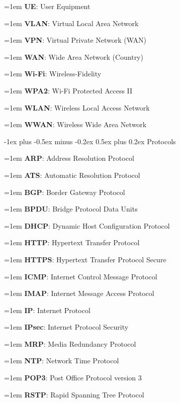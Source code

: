 \documentclass[letterpaper,8pt]{extarticle}
\makeatletter
\newcommand{\definition}[2]{
  \hangindent=1em
  \textbf{#1}: #2%
}
\renewcommand{\subsection}{\@startsection{subsection}{2}{0mm}%
  {-1ex plus -0.5ex minus -0.2ex}%
  {0.5ex plus 0.2ex}%
{\color{h2}\normalfont\fontsize{6}{6}\selectfont\bfseries}}
\makeatother
\begin{document}
\begin{multicols*}{5}
\begin{multicols*}{2}
    \definition{UE}{User Equipment}
    
    \definition{VLAN}{Virtual Local Area Network}
    
    \definition{VPN}{Virtual Private Network (WAN)}
    
    \definition{WAN}{Wide Area Network (Country)}
    
    \definition{Wi-Fi}{Wireless-Fidelity}
    
    \definition{WPA2}{Wi-Fi Protected Access II}
    
    \definition{WLAN}{Wireless Local Access Network}
    
    \definition{WWAN}{Wireless Wide Area Network}
    
  \end{multicols*}
  
  \subsection{Protocols}
  
  \begin{multicols*}{2}
    
    \definition{ARP}{Address Resolution Protocol}
    
    \definition{ATS}{Automatic Resolution Protocol}
    
    \definition{BGP}{Border Gateway Protocol}
    
    \definition{BPDU}{Bridge Protocol Data Units}
    
    \definition{DHCP}{Dynamic Host Configuration Protocol}
    
    \definition{HTTP}{Hypertext Transfer Protocol}
    
    \definition{HTTPS}{Hypertext Transfer Protocol Secure}
    
    \definition{ICMP}{Internet Control Message Protocol}
    
    \definition{IMAP}{Internet Message Access Protocol}
    
    \definition{IP}{Internet Protocol}
    
    \definition{IPsec}{Internet Protocol Security}
    
    \definition{MRP}{Media Redundancy Protocol}
    
    \definition{NTP}{Network Time Protocol}
    
    \definition{POP3}{Post Office Protocol version 3}
    
    \definition{RSTP}{Rapid Spanning Tree Protocol}
    

\end{multicols*}
\end{multicols*}
\end{document}
